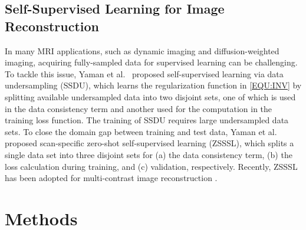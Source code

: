 \documentclass[journal,twoside,web]{ieeecolor}
\begin{document}
	\subsection{Self-Supervised Learning for Image Reconstruction}

	In many MRI applications, 
	such as dynamic imaging and diffusion-weighted imaging,
	acquiring fully-sampled data
	for supervised learning can be challenging.
	To tackle this issue, Yaman et al.~\cite{yaman_2020_ssdu}
	proposed self-supervised learning via data undersampling (SSDU),
	which learns the regularization function in \cref{EQU:INV}
	by splitting available undersampled data into two disjoint sets,
	one of which is used in the data consistency term and
	another used for the computation in the training loss function.
	The training of SSDU requires large undersampled data sets.
	To close the domain gap between training and test data,
	Yaman et al.~\cite{yaman_2022_zs} proposed
	scan-specific zero-shot self-supervised learning (ZSSSL),
	which splits a single data set into three disjoint sets
	for (a) the data consistency term, (b) the loss calculation during training,
	and (c) validation, respectively.
	Recently, ZSSSL has been adopted for multi-contrast image reconstruction
	\cite{heydari_2024_jmaple}.

	\section{Methods}
\end{document}
